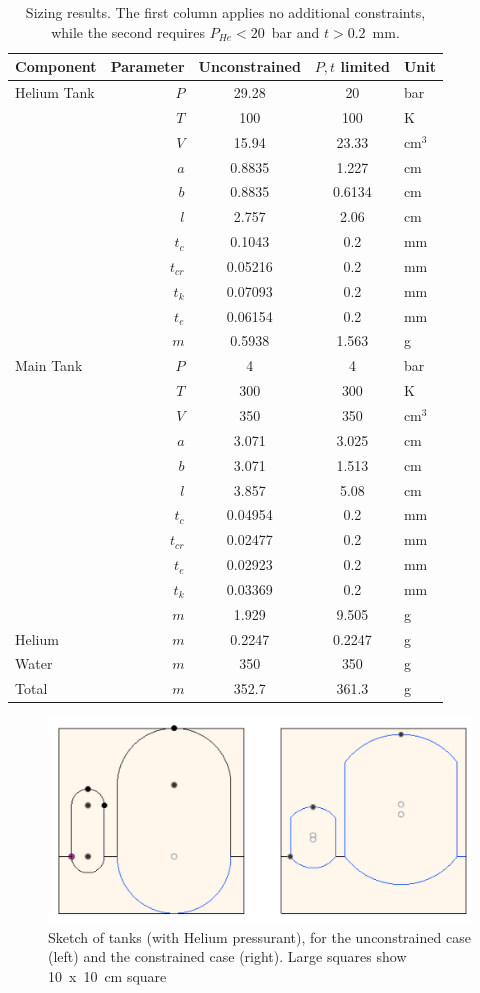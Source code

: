 \documentclass[12pt]{article}
\begin{document}
\begin{table}[htbp]
\centering
\caption{Sizing results. The first column applies no additional constraints, while the second requires $P_{He}< 20$~bar and $t>0.2$~mm.}
\begin{tabular}{@{} lrSSl @{}}
\toprule
{Component}  & {Parameter} & {Unconstrained}  & {$P, t$ limited} &{Unit}\\ 
\midrule
Helium Tank & $P$ & 29.28 & 20 & bar\\
	& $T$ & 100 & 100 & K\\
	& $V$ & 15.94 & 23.33 & cm$^3$\\
	&$a$ & 0.8835 & 1.227 &  cm\\
	&$b$& 0.8835 & 0.6134& cm\\
	& $l$ & 2.757 &2.06 &  cm\\
	& $t_c$ & 0.1043  &0.2  & mm\\
	& $t_{cr}$ & 0.05216 & 0.2  & mm\\
	& $t_k$ & 0.07093   & 0.2 & mm\\
	& $t_e$ & 0.06154  & 0.2 &  mm\\
	& $m$ & 0.5938 & 1.563 & g\\
Main Tank & $P$ & 4 & 4 & bar\\
	& $T$& 300 & 300 & K \\
	& $V$ & 350 & 350 & cm$^3$\\
	& $a$ & 3.071 & 3.025 &  cm \\
	& $b$ & 3.071 & 1.513 & cm\\
	& $l$ & 3.857 & 5.08  & cm \\
	& $t_c$ & 0.04954 &0.2  &mm \\
	&$  t_{cr} $ & 0.02477  & 0.2 &mm \\
	&$ t_e $& 0.02923 & 0.2  &mm \\
	&$t_k $& 0.03369 & 0.2  &mm \\
	& $m$ & 1.929 & 9.505& g\\
Helium & $m$ & 0.2247  & 0.2247 & g\\
Water & $m$ & 350 & 350 & g\\
\midrule
Total & $m$ & 352.7 &  361.3 &g\\
	      \bottomrule
\end{tabular}
\label{tbl:optimalParams}
\end{table}

\begin{figure}[htbp]
   \centering 
   \includegraphics[width=0.8\linewidth]{He_tank_sketch}
   \caption{Sketch of tanks (with Helium pressurant), for the unconstrained case (left) and the constrained case (right). Large squares show 10~x~10~cm square}
   \label{fig:}
\end{figure}
\end{document}
